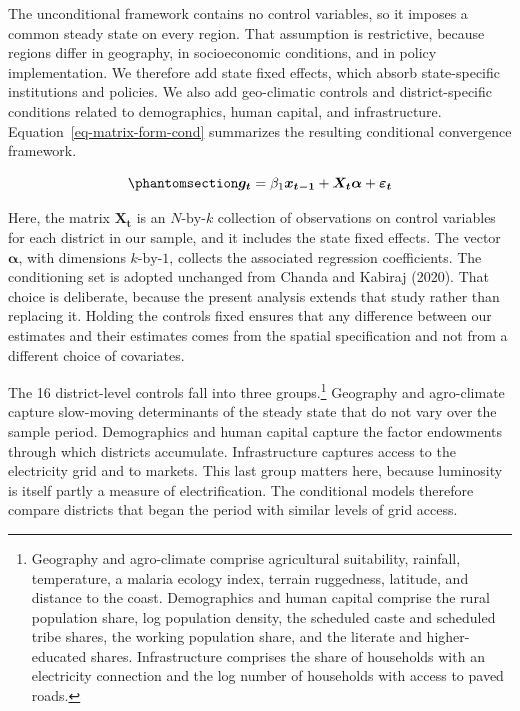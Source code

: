\documentclass[
  letterpaper,
  DIV=11,
  numbers=noendperiod]{scrartcl}
\begin{document}
The unconditional framework contains no control variables, so it imposes
a common steady state on every region. That assumption is restrictive,
because regions differ in geography, in socioeconomic conditions, and in
policy implementation. We therefore add state fixed effects, which
absorb state-specific institutions and policies. We also add
geo-climatic controls and district-specific conditions related to
demographics, human capital, and infrastructure.
Equation~\ref{eq-matrix-form-cond} summarizes the resulting conditional
convergence framework.

\begin{equation}\phantomsection\label{eq-matrix-form-cond}{
\boldsymbol{g_t} =  \beta_1 \boldsymbol{x_{t-1}} + \boldsymbol{X_t} \boldsymbol{\alpha}  + \boldsymbol{\varepsilon_t}
}\end{equation}

Here, the matrix \(\boldsymbol{X_t}\) is an \(N\text{-by-}k\) collection
of observations on control variables for each district in our sample,
and it includes the state fixed effects. The vector
\(\boldsymbol{\alpha}\), with dimensions \(k\text{-by-}1\), collects the
associated regression coefficients. The conditioning set is adopted
unchanged from Chanda and Kabiraj (2020). That choice is deliberate,
because the present analysis extends that study rather than replacing
it. Holding the controls fixed ensures that any difference between our
estimates and their estimates comes from the spatial specification and
not from a different choice of covariates.

The 16 district-level controls fall into three groups.\footnote{Geography
  and agro-climate comprise agricultural suitability, rainfall,
  temperature, a malaria ecology index, terrain ruggedness, latitude,
  and distance to the coast. Demographics and human capital comprise the
  rural population share, log population density, the scheduled caste
  and scheduled tribe shares, the working population share, and the
  literate and higher-educated shares. Infrastructure comprises the
  share of households with an electricity connection and the log number
  of households with access to paved roads.} Geography and agro-climate
capture slow-moving determinants of the steady state that do not vary
over the sample period. Demographics and human capital capture the
factor endowments through which districts accumulate. Infrastructure
captures access to the electricity grid and to markets. This last group
matters here, because luminosity is itself partly a measure of
electrification. The conditional models therefore compare districts that
began the period with similar levels of grid access.
\end{document}
